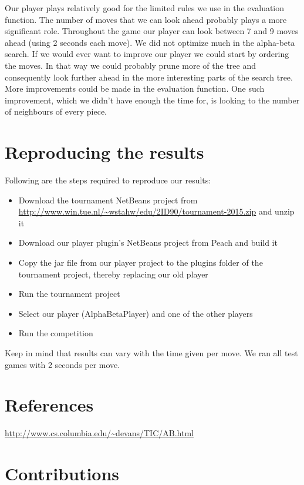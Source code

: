 \documentclass[11pt,a4paper]{article}
\begin{document}
Our player plays relatively good for the limited rules we use in the evaluation function. The number of moves that we can look ahead probably plays a more significant role. Throughout the game our player can look between 7 and 9 moves ahead (using 2 seconds each move). We did not optimize much in the alpha-beta search. If we would ever want to improve our player we could start by ordering the moves. In that way we could probably prune more of the tree and consequently look further ahead in the more interesting parts of the search tree. More improvements could be made in the evaluation function. One such improvement, which we didn't have enough the time for, is looking to the number of neighbours of every piece.

\section{Reproducing the results}
Following are the steps required to reproduce our results:
\begin{itemize}
\item Download the tournament NetBeans project from \url{http://www.win.tue.nl/~wstahw/edu/2ID90/tournament-2015.zip} and unzip it
\item Download our player plugin's NetBeans project from Peach and build it
\item Copy the jar file from our player project to the plugins folder of the tournament project, thereby replacing our old player
\item Run the tournament project
\item Select our player (AlphaBetaPlayer) and one of the other players
\item Run the competition
\end{itemize}
Keep in mind that results can vary with the time given per move. We ran all test games with 2 seconds per move.

\section{References}
\url{http://www.cs.columbia.edu/~devans/TIC/AB.html}

\section{Contributions}
\end{document}
